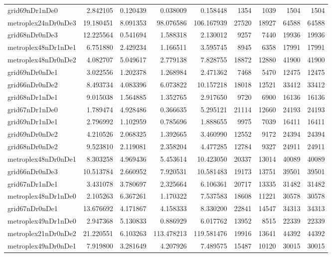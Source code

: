 \begin{longtable}{|l|r|r|r|r|r|r|r|r|}
grid69nDr1nDe0 & 2.842105 & 0.120439 & 0.038009 & 0.158448 & 1354 & 1039 & 1504 & 1504 \\
metroplex24nDr0nDe3 & 19.180451 & 8.091353 & 98.076586 & 106.167939 & 27520 & 18927 & 64588 & 64588 \\
grid68nDr0nDe3 & 12.225564 & 0.541694 & 1.588318 & 2.130012 & 9257 & 7440 & 19936 & 19936 \\
metroplex48nDr1nDe1 & 6.751880 & 2.429234 & 1.166511 & 3.595745 & 8945 & 6358 & 17991 & 17991 \\
metroplex48nDr0nDe2 & 4.082707 & 5.049617 & 2.779138 & 7.828755 & 18872 & 12880 & 41900 & 41900 \\
grid69nDr0nDe1 & 3.022556 & 1.202378 & 1.268984 & 2.471362 & 7468 & 5470 & 12475 & 12475 \\
grid66nDr0nDe2 & 8.493734 & 4.083396 & 6.073822 & 10.157218 & 18018 & 12521 & 33412 & 33412 \\
grid68nDr1nDe1 & 9.015038 & 1.564885 & 1.352765 & 2.917650 & 9720 & 6900 & 16136 & 16136 \\
grid67nDr1nDe0 & 1.789474 & 4.928486 & 0.366635 & 5.295121 & 21114 & 12660 & 24193 & 24193 \\
grid69nDr1nDe1 & 2.796992 & 1.102959 & 0.785696 & 1.888655 & 9975 & 7039 & 16411 & 16411 \\
grid69nDr0nDe2 & 4.210526 & 2.068325 & 1.392665 & 3.460990 & 12552 & 9172 & 24394 & 24394 \\
grid68nDr0nDe2 & 9.523810 & 2.119081 & 2.358204 & 4.477285 & 12784 & 9327 & 24911 & 24911 \\
metroplex48nDr0nDe1 & 8.303258 & 4.969436 & 5.453614 & 10.423050 & 20337 & 13014 & 40089 & 40089 \\
grid66nDr0nDe3 & 10.513784 & 2.660952 & 7.920531 & 10.581483 & 19173 & 13751 & 39501 & 39501 \\
grid67nDr1nDe1 & 3.431078 & 3.780697 & 2.325664 & 6.106361 & 20717 & 13335 & 31482 & 31482 \\
metroplex48nDr1nDe0 & 2.105263 & 6.367261 & 1.170322 & 7.537583 & 18608 & 11221 & 30578 & 30578 \\
grid67nDr0nDe1 & 13.676692 & 4.171867 & 4.158333 & 8.330200 & 22841 & 14547 & 34313 & 34313 \\
metroplex49nDr1nDe0 & 2.947368 & 5.130833 & 0.886929 & 6.017762 & 13952 & 8515 & 22339 & 22339 \\
metroplex21nDr0nDe2 & 21.220551 & 6.103263 & 113.478213 & 119.581476 & 19916 & 13641 & 44392 & 44392 \\
metroplex49nDr0nDe1 & 7.919800 & 3.281649 & 4.207926 & 7.489575 & 15487 & 10120 & 30015 & 30015 \\

\end{longtable}
